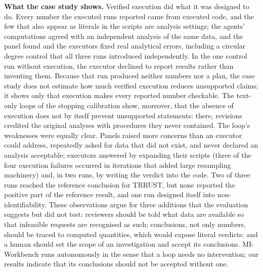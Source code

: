\textbf{What the case study shows.} Verified execution did what it was designed to do. Every number the executed runs reported came from executed code, and the few that also appear as literals in the scripts are analysis settings; the agents' computations agreed with an independent analysis of the same data, and the panel found and the executors fixed real analytical errors, including a circular degree control that all three runs introduced independently. In the one control run without execution, the executor declined to report results rather than inventing them. Because that run produced neither numbers nor a plan, the case study does not estimate how much verified execution reduces unsupported claims; it shows only that execution makes every reported number checkable. The text-only loops of the stopping calibration show, moreover, that the absence of execution does not by itself prevent unsupported statements: there, revisions credited the original analyses with procedures they never contained. The loop's weaknesses were equally clear. Panels raised more concerns than an executor could address, repeatedly asked for data that did not exist, and never declared an analysis acceptable; executors answered by expanding their scripts (three of the four execution failures occurred in iterations that added large resampling machinery) and, in two runs, by writing the verdict into the code. Two of three runs reached the reference conclusion for TRRUST, but none reported the positive part of the reference result, and one run designed itself into non-identifiability. These observations argue for three additions that the evaluation suggests but did not test: reviewers should be told what data are available so that infeasible requests are recognised as such; conclusions, not only numbers, should be traced to computed quantities, which would expose literal verdicts; and a human should set the scope of an investigation and accept its conclusions. MI-Workbench runs autonomously in the sense that a loop needs no intervention; our results indicate that its conclusions should not be accepted without one.

